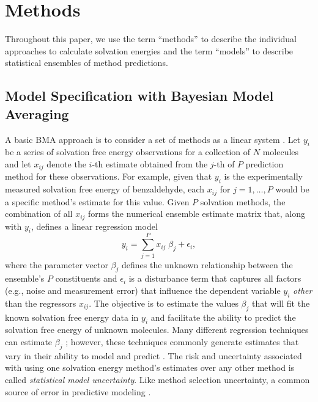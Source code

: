 \documentclass[journal=jpcbfk, manuscript=article]{achemso}
\newcommand{\+}[1]{\ensuremath{\mathbf{#1}}}
\begin{document}
\section{Methods} \label{MethodMain}

Throughout this paper, we use the term ``methods'' to describe the individual approaches to calculate solvation energies and the term ``models'' to describe statistical ensembles of method predictions.

\subsection{Model Specification with Bayesian Model Averaging} \label{Method} 

A basic BMA approach is to consider a set of methods as a linear system \cite{Hoeting:1999, Raftery:1998, Raftery:1995}.
Let $y_i$ be a series of solvation free energy observations for a collection of $N$ molecules
and let $x_{i j}$ denote the $i$-th estimate obtained from the $j$-th of $P$ prediction method for these observations.
For example, given that $y_i$ is the experimentally measured solvation free energy of benzaldehyde, each $x_{i j}$ for $j = 1, \ldots, P$ would be a specific method's estimate for this value.
Given $P$ solvation methods, the combination of all $x_{ij}$ forms the numerical ensemble estimate matrix that, along with $y_i$, defines a linear regression model 
\begin{equation} \label{Method:E1}
	y_i = \sum_{j=1}^P x_{ij} \;\beta_j + \epsilon_i,
\end{equation}
where the parameter vector $\beta_j$ defines the unknown relationship between the ensemble's $P$ constituents and $\epsilon_i$ is a disturbance term that captures all factors (e.g., noise and measurement error) that influence the dependent variable $y_i$ \emph{other} than the regressors $x_{ij}$.
The objective is to estimate the values $\beta_j$ that will fit the known solvation free energy data in $y_i$ and facilitate the ability to predict the solvation free energy of unknown molecules.
Many different regression techniques can estimate $\beta_j$ \cite{Hosmer:1989, Reiss:2012, Mallows:1973, Candes:2007}; however, these techniques commonly generate estimates that vary in their ability to model and predict \cite{Genell:2010, Hoeting:1999, Davidson:2006, Raftery:1995, Raftery:1998}.  
The risk and uncertainty associated with using one solvation energy method's estimates over any other method is called \emph{statistical model uncertainty}. Like method selection uncertainty, a common source of error in predictive modeling \cite{Raftery:1995, Raftery:1998, Hoeting:1999, Raftery:2005, Volinsky:1997}.  
\end{document}
